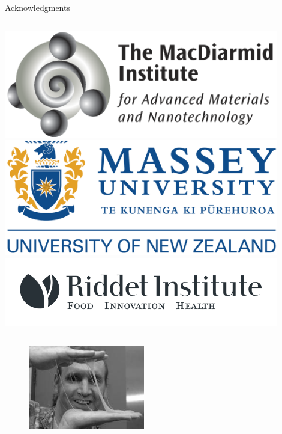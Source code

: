 \documentclass[9pt]{beamer}
\begin{document}
\begin{frame}{Acknowledgments}

  \vspace{0.3cm}
  \begin{columns}[onlytextwidth]
    \includegraphics[width=0.9\textwidth]{./Figures/people/macdiarmid.png}
    \includegraphics[width=0.9\textwidth]{./Figures/people/massey.png}
    \includegraphics[width=0.9\textwidth]{./Figures/people/riddet.png}
  \end{columns}
  \begin{columns}[onlytextwidth]
\begin{figure}[htpb]
  \centering
  \includegraphics[width=0.8\textwidth]{./Figures/people/bill.png}

\end{figure}
\end{columns}
\end{frame}
\end{document}
